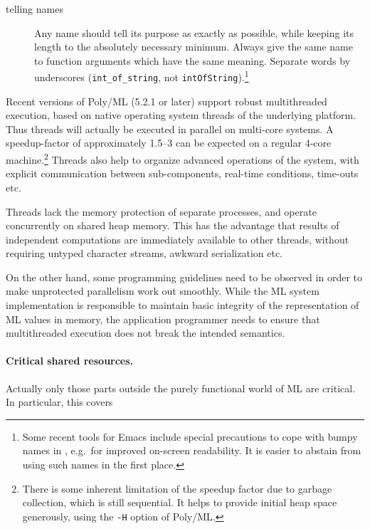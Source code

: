 \begin{isabellebody}
\begin{isamarkuptext}
\begin{description}
    \item[telling names]
      Any name should tell its purpose as exactly as possible, while
      keeping its length to the absolutely necessary minimum.  Always
      give the same name to function arguments which have the same
      meaning. Separate words by underscores (\verb|int_of_string|, not \verb|intOfString|).\footnote{Some
      recent tools for Emacs include special precautions to cope with
      bumpy names in , e.g.\ for improved on-screen
      readability.  It is easier to abstain from using such names in the
      first place.}

  \end{description}%
\end{isamarkuptext}%
\isamarkuptrue%
%
\isamarkuptrue%
%
\begin{isamarkuptext}%
Recent versions of Poly/ML (5.2.1 or later) support robust
  multithreaded execution, based on native operating system threads of
  the underlying platform.  Thus threads will actually be executed in
  parallel on multi-core systems.  A speedup-factor of approximately
  1.5--3 can be expected on a regular 4-core machine.\footnote{There
  is some inherent limitation of the speedup factor due to garbage
  collection, which is still sequential.  It helps to provide initial
  heap space generously, using the \texttt{-H} option of Poly/ML.}
  Threads also help to organize advanced operations of the system,
  with explicit communication between sub-components, real-time
  conditions, time-outs etc.

  Threads lack the memory protection of separate processes, and
  operate concurrently on shared heap memory.  This has the advantage
  that results of independent computations are immediately available
  to other threads, without requiring untyped character streams,
  awkward serialization etc.

  On the other hand, some programming guidelines need to be observed
  in order to make unprotected parallelism work out smoothly.  While
  the ML system implementation is responsible to maintain basic
  integrity of the representation of ML values in memory, the
  application programmer needs to ensure that multithreaded execution
  does not break the intended semantics.

  \medskip \paragraph{Critical shared resources.} Actually only those
  parts outside the purely functional world of ML are critical.  In
  particular, this covers


\end{isamarkuptext}
\end{isabellebody}
